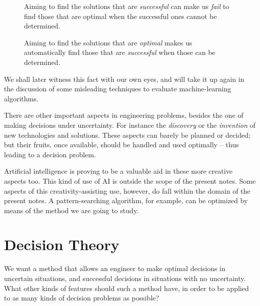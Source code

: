 \documentclass[
  a4paper,
  DIV=11,
  numbers=noendperiod,
  oneside]{scrreprt}
\begin{document}
\begin{figure}

\begin{tcolorbox}[enhanced jigsaw, rightrule=.15mm, colbacktitle=quarto-callout-note-color!10!white, coltitle=black, titlerule=0mm, title={}, colback=white, bottomrule=.15mm, toptitle=1mm, opacitybacktitle=0.6, toprule=.15mm, arc=.35mm, bottomtitle=1mm, colframe=quarto-callout-note-color-frame, breakable, left=2mm, opacityback=0, leftrule=.75mm]

{Aiming to find the solutions that are \emph{successful} can make us
\emph{fail} to find those that are optimal when the successful ones
cannot be determined.}

{Aiming to find the solutions that are \emph{optimal} makes us
automatically find those that are \emph{successful} when those can be
determined.}

\end{tcolorbox}

\end{figure}

We shall later witness this fact with our own eyes, and will take it up
again in the discussion of some misleading techniques to evaluate
machine-learning algorithms.

\hfill\break

There are other important aspects in engineering problems, besides the
one of making decisions under uncertainty. For instance the
\emph{discovery} or the \emph{invention} of new technologies and
solutions. These aspects can barely be planned or decided; but their
fruits, once available, should be handled and used optimally -- thus
leading to a decision problem.

Artificial intelligence is proving to be a valuable aid in these more
creative aspects too. This kind of use of AI is outside the scope of the
present notes. Some aspects of this creativity-assisting use, however,
do fall within the domain of the present notes. A pattern-searching
algorithm, for example, can be optimized by means of the method we are
going to study.

\hypertarget{decision-theory}{%
\section{Decision Theory}\label{decision-theory}}

We want a method that allows an engineer to make optimal decisions in
uncertain situations, and successful decisions in situations with no
uncertainty. What other kinds of features should such a method have, in
order to be applied to as many kinds of decision problems as possible?
\end{document}
